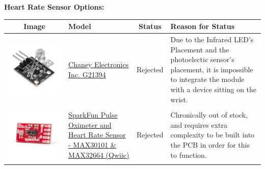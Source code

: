 \documentclass[12pt, titlepage]{article}
\begin{document}
\textbf{Heart Rate Sensor Options:}\\

\begin{table}[H]
\begin{tabular}{ | c | m{3cm} | c | m{7cm} |}
\hline
\textbf{Image} & \textbf{Model} & \textbf{Status} & \textbf{Reason for Status}\\
\hline
 \includegraphics[scale = 0.5]{G21394} & \href{https://secure.sayal.com/STORE2/View_SHOP.php?SKU=247799}{Chaney Electronics Inc. G21394}  & Rejected & Due to the Infrared LED's Placement and the photoelectic sensor's placement, it is impossible to integrate the module with a device sitting on the wrist.\\
\hline
 \includegraphics[scale = 0.5]{sparkfun} & \href{https://www.sparkfun.com/products/15219}{SparkFun Pulse Oximeter and Heart Rate Sensor - MAX30101 \& MAX32664 (Qwiic)}  & Rejected & Chronically out of stock, and requires extra complexity to be built into the PCB in order for this to function.\\

\end{tabular}
\end{table}
\end{document}
